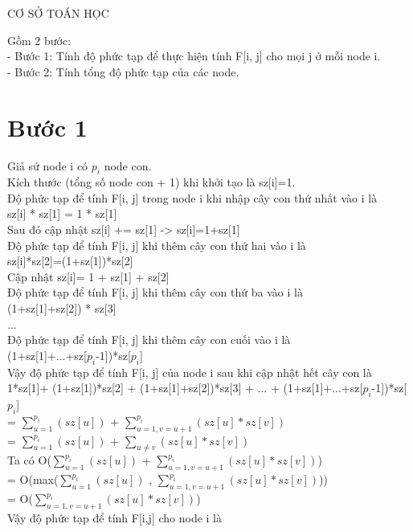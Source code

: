 \documentclass[10pt,a4paper]{article}
\begin{document}
\begin{center}
    \fontsize{30}{30}\selectfont
    CƠ SỞ TOÁN HỌC
\end{center}
\fontsize{14}{20}\selectfont
Gồm 2 bước:\\
- Bước 1: Tính độ phức tạp để thực hiện tính F[i, j] cho mọi j ở mỗi node i.\\
- Bước 2: Tính tổng độ phức tạp của các node.\\
\section[\textbf]{Bước 1}
Giả sử node i có $p_i$ node con.\\
Kích thước (tổng số node con + 1) khi khởi tạo là sz[i]=1.\\
Độ phức tạp để tính F[i, j] trong node i khi nhập cây con thứ nhất vào i là\\
sz[i] * sz[1] = 1 * sz[1]\\
Sau đó cập nhật sz[i] += sz[1] -> sz[i]=1+sz[1]\\
Độ phức tạp để tính F[i, j] khi thêm cây con thứ hai vào i là \\
sz[i]*sz[2]=(1+sz[1])*sz[2]\\
Cập nhật sz[i]= 1 + sz[1] + sz[2]\\
Độ phức tạp để tính F[i, j] khi thêm cây con thứ ba vào i là\\
(1+sz[1]+sz[2]) * sz[3]\\
...\\
Độ phức tạp để tính F[i, j] khi thêm cây con cuối vào i là\\
(1+sz[1]+...+sz[$p_i$-1])*sz[$p_i$]\\
\fontsize{14}{25}\selectfont
Vậy độ phức tạp để tính F[i, j] của node i sau khi cập nhật hết cây con là\\
1*sz[1]+ (1+sz[1])*sz[2] + (1+sz[1]+sz[2])*sz[3] + ... + (1+sz[1]+...+sz[$p_i$-1])*sz[$p_i$]\\
= $\sum_{u=1}^{p_i}(sz[u])$ + $\sum_{u=1, v=u+1}^{p_i}(sz[u]*sz[v])$\\
= $\sum_{u=1}^{p_i}(sz[u])$ + $\sum_{u \neq v}^{}(sz[u]*sz[v])$\\
Ta có O($\sum_{u=1}^{p_i}(sz[u])$ + $\sum_{u=1, v=u+1}^{p_i}(sz[u]*sz[v])$)\\
= O(max($\sum_{u=1}^{p_i}(sz[u])$ , $\sum_{u=1, v=u+1}^{p_i}(sz[u]*sz[v])$))\\
= O($\sum_{u=1, v=u+1}^{p_i}(sz[u]*sz[v])$)\\
Vậy độ phức tạp để tính F[i,j] cho node i là\\
\end{document}

